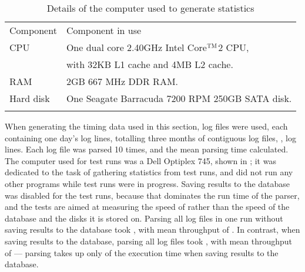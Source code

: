 
\begin{table}[thbp]
    \caption{Details of the computer used to generate statistics}
    \empty{}\label{Details of the computer used to generate statistics}
    \centering{}
    \begin{tabular}[]{ll}
        \tabletopline{}%
        Component  & Component in use                                   \\
        \tablemiddleline{}%
        CPU         & One dual core 2.40GHz Intel\textregistered{}
                        Core$^{\textsc{TM}}$2 CPU,                      \\
                    & with 32KB L1 cache and 4MB L2 cache.              \\
        RAM         & 2GB 667 MHz DDR RAM\@.                            \\
        Hard disk   & One Seagate Barracuda 7200 RPM 250GB SATA disk.   \\
        \tablebottomline{}%
    \end{tabular}
\end{table}

When generating the timing data used in this section, \numberOFlogFILES{}
log files were used, each containing one day's log lines, totalling three
months of contiguous log files,
, \numberOFlogLINEShuman{}
log lines.  Each log file was parsed 10 times, and the mean parsing time
calculated.  The computer used for test runs was a Dell Optiplex 745, shown
in ; it was
dedicated to the task of gathering statistics from test runs, and did not
run any other programs while test runs were in progress.  Saving results to
the database was disabled for the test runs, because that dominates the run
time of the parser, and the tests are aimed at measuring the speed of
\parsername{} rather than the speed of the database and the disks it is
stored on.  Parsing all \numberOFlogFILES{} log files in one run without
saving results to the database took
, with mean throughput of
.  In contrast, when saving
results to the database, parsing all \numberOFlogFILES{} log files took
, with mean throughput of
 --- parsing takes up only
 of the
execution time when saving results to the database.

